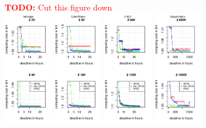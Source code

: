 \documentclass[conference]{IEEEtran}
\newcommand{\TODO}[1]{
  {\Large \textcolor{red}{\textbf{TODO: }#1}}
}
\begin{document}
\begin{figure}[htb] 
\TODO{Cut this figure down}\\
\centering
\includegraphics[width=0.19\textwidth]{pareto-cost-MONTAGE-n-1000-8-dagh1-20m0}
\includegraphics[width=0.19\textwidth]{pareto-cost-CYBERSHAKE-n-1000-8-dagh1-20m0}
\includegraphics[width=0.19\textwidth]{pareto-cost-LIGO-n-1000-8-dagh1-40m0}
\includegraphics[width=0.19\textwidth]{pareto-cost-GENOME-n-1000-8-dagh100-1500m0}

\end{figure}
\end{document}
